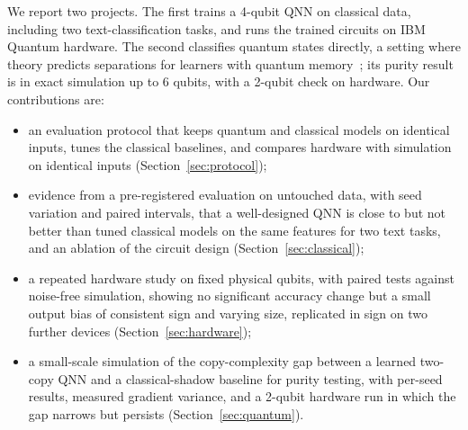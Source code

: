 \documentclass[11pt]{article}
\begin{document}
We report two projects. The first trains a 4-qubit QNN on classical data, including two text-classification tasks, and runs the trained circuits on IBM Quantum hardware. The second classifies quantum states directly, a setting where theory predicts separations for learners with quantum memory~\cite{huang2022experiments,chen2021memory,aharonov2022qam}; its purity result is in exact simulation up to 6 qubits, with a 2-qubit check on hardware. Our contributions are:
\begin{itemize}
  \item an evaluation protocol that keeps quantum and classical models on identical inputs, tunes the classical baselines, and compares hardware with simulation on identical inputs (Section~\ref{sec:protocol});
  \item evidence from a pre-registered evaluation on untouched data, with seed variation and paired intervals, that a well-designed QNN is close to but not better than tuned classical models on the same features for two text tasks, and an ablation of the circuit design (Section~\ref{sec:classical});
  \item a repeated hardware study on fixed physical qubits, with paired tests against noise-free simulation, showing no significant accuracy change but a small output bias of consistent sign and varying size, replicated in sign on two further devices (Section~\ref{sec:hardware});
  \item a small-scale simulation of the copy-complexity gap between a learned two-copy QNN and a classical-shadow baseline for purity testing, with per-seed results, measured gradient variance, and a 2-qubit hardware run in which the gap narrows but persists (Section~\ref{sec:quantum}).
\end{itemize}
\end{document}
